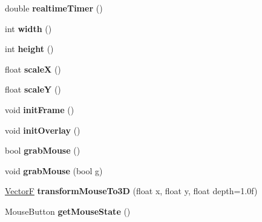 \begin{DoxyCompactItemize}
\item 
\hypertarget{namespaceDisplay_a136c8545324adbedf4a5fccc5fa07c36}{double {\bfseries realtime\+Timer} ()}\label{namespaceDisplay_a136c8545324adbedf4a5fccc5fa07c36}

\item 
\hypertarget{namespaceDisplay_a0fc77193f1cf221722c6d1c6f23fde88}{int {\bfseries width} ()}\label{namespaceDisplay_a0fc77193f1cf221722c6d1c6f23fde88}

\item 
\hypertarget{namespaceDisplay_aabc87bacee03d9276811a31622799b08}{int {\bfseries height} ()}\label{namespaceDisplay_aabc87bacee03d9276811a31622799b08}

\item 
\hypertarget{namespaceDisplay_a6d9beae04ff3fc2583c9e7c7f0d7b2fb}{float {\bfseries scale\+X} ()}\label{namespaceDisplay_a6d9beae04ff3fc2583c9e7c7f0d7b2fb}

\item 
\hypertarget{namespaceDisplay_aef6c470eb1ee042c6984e87591b5e95c}{float {\bfseries scale\+Y} ()}\label{namespaceDisplay_aef6c470eb1ee042c6984e87591b5e95c}

\item 
\hypertarget{namespaceDisplay_a2d5d3d2ab96e60b6239d83e6176428dd}{void {\bfseries init\+Frame} ()}\label{namespaceDisplay_a2d5d3d2ab96e60b6239d83e6176428dd}

\item 
\hypertarget{namespaceDisplay_a7e2eedac5610e9baf474c9b0864d8bca}{void {\bfseries init\+Overlay} ()}\label{namespaceDisplay_a7e2eedac5610e9baf474c9b0864d8bca}

\item 
\hypertarget{namespaceDisplay_a5393ebaa10c357b78b308c8b3837ede6}{bool {\bfseries grab\+Mouse} ()}\label{namespaceDisplay_a5393ebaa10c357b78b308c8b3837ede6}

\item 
\hypertarget{namespaceDisplay_ab9c233b3e12e20587511a19ce1c820ec}{void {\bfseries grab\+Mouse} (bool g)}\label{namespaceDisplay_ab9c233b3e12e20587511a19ce1c820ec}

\item 
\hypertarget{namespaceDisplay_aecf902335b6ef750c0ad1018b8e1bf87}{\hyperlink{structVectorF}{Vector\+F} {\bfseries transform\+Mouse\+To3\+D} (float x, float y, float depth=1.\+0f)}\label{namespaceDisplay_aecf902335b6ef750c0ad1018b8e1bf87}

\item 
\hypertarget{namespaceDisplay_ac777d44200666a2d31be774e78570378}{Mouse\+Button {\bfseries get\+Mouse\+State} ()}\label{namespaceDisplay_ac777d44200666a2d31be774e78570378}


\end{DoxyCompactItemize}
